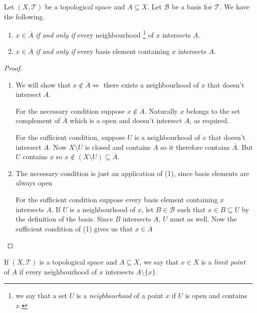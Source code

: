 \begin{thm}
  \label{thm:closure-equivalent}
  Let $(X, \mathscr{T})$ be a topological space and $A \subseteq
  X$. Let $\mathscr{B}$ be a basis for $\mathscr{T}$. We have the
  following.
  \begin{enumerate}
  \item $x \in \overline{A}$ \emph{if and only if} every
    neighbourhood \footnote{we say that a set $U$ is a
      \emph{neighbourhood} of a point $x$ if $U$ is open and contains
      $x$.} of $x$ intersects $A$.
  \item $x \in \overline{A}$ \emph{if and only if} every
    basis element containing $x$ intersects $A$.
  \end{enumerate}
\end{thm}

\begin{proof}
  \begin{enumerate}
  \item We will show that $x \not\in \overline{A} \iff$ there exists a
    neighbourhood of $x$ that doesn't intersect $A$.

    For the necessary condition suppose $x \not\in
    \overline{A}$. Naturally $x$ belongs to the set complement of
    $\overline{A}$ which is a open and doesn't intersect $A$, as
    required.
    
    For the sufficient condition, suppose $U$ is a neighbourhood
    of $x$ that doesn't intersect $A$. Now $X \setminus U$ is closed
    and contains $A$ so it therefore contains $\overline{A}$. But $U$
    contains $x$ so $x \not\in (X \setminus U) \subseteq
    \overline{A}$.
  \item The necessary condition is just an application of (1), since
    basis elements are always open

    For the sufficient condition suppose every basis element
    containing $x$ intersects $A$. If $U$ is a neighbourhood of $x$,
    let $B \in \mathscr{B}$ such that $x \in B \subseteq U$ by the
    definition of the basis. Since $B$ intersects $A$, $U$ must as
    well. Now the sufficient condition of (1) gives us that $x \in
    \overline{A}$ 
  \end{enumerate}
\end{proof}

\begin{defn}
  If $(X, \mathscr{T})$ is a topological space and $A \subseteq X$, we
  say that $x \in X$ is a \emph{limit point} of $A$ if every
  neighbourhood of $x$ intersects $A \setminus \{ x \}$. 
\end{defn}

